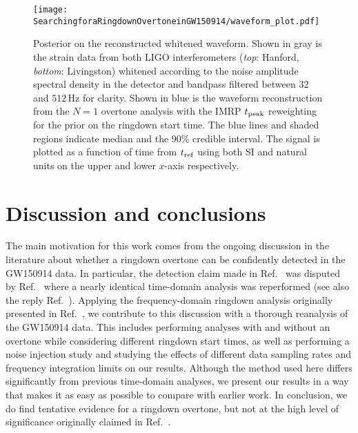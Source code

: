 \begin{figure}[t]
    \centering
    \texttt{[image: SearchingforaRingdownOvertoneinGW150914/waveform\_plot.pdf]}
    \caption[Posterior on the GW150914 reconstructed whitened waveform]{ 
    Posterior on the reconstructed whitened waveform.
    Shown in gray is the strain data from both LIGO interferometers (\emph{top}: Hanford, \emph{bottom}: Livingston) whitened according to the noise amplitude spectral density in the detector and bandpass filtered between 32 and $512\,\mathrm{Hz}$ for clarity.
    Shown in blue is the waveform reconstruction from the $N=1$ overtone analysis with the IMRP $t_{\rm peak}$ reweighting for the prior on the ringdown start time.
    The blue lines and shaded regions indicate median and the 90\% credible interval. 
    The signal is plotted as a function of time from $t_{\rm ref}$ using both SI and natural units on the upper and lower $x$-axis respectively.
    }
    \label{fig:waveform}
\end{figure}


\section{Discussion and conclusions}\label{ch4:sec:discussion}

The main motivation for this work comes from the ongoing discussion in the literature about whether a ringdown overtone can be confidently detected in the GW150914 data. 
In particular, the detection claim made in Ref.~\cite{Isi:2019aib} was disputed by Ref.~\cite{Cotesta:2022pci} where a nearly identical time-domain analysis was reperformed (see also the reply Ref.~\cite{Isi:2022mhy}).
Applying the frequency-domain ringdown analysis originally presented in Ref.~\cite{Finch:2021qph}, we contribute to this discussion with a thorough reanalysis of the GW150914 data. 
This includes performing analyses with and without an overtone while considering different ringdown start times, as well as performing a noise injection study and studying the effects of different data sampling rates and frequency integration limits on our results.
Although the method used here differs significantly from previous time-domain analyses, we present our results in a way that makes it as easy as possible to compare with earlier work.
In conclusion, we do find tentative evidence for a ringdown overtone, but not at the high level of significance originally claimed in Ref.~\cite{Isi:2019aib}.

